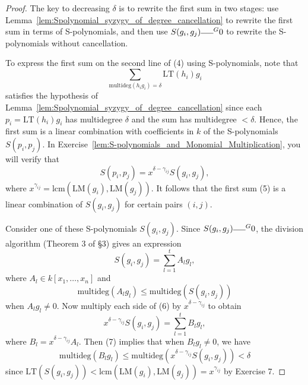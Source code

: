 \begin{proof}
  The key to decreasing $\delta$ is to rewrite the first sum in two stages: use Lemma~\ref{lem:Spolynomial_syzygy_of_degree_cancellation} to rewrite the first sum in terms of S-polynomials, and then use $S(g_i, g_j) \overline{\hspace{1.5em}}^G 0$ to rewrite the S-polynomials without cancellation.

  To express the first sum on the second line of (4) using S-polynomials, note that
  \begin{equation} \tag{5}
  \sum_{\text{multideg}(h_i g_i) = \delta} \text{LT}(h_i) g_i
  \end{equation}
  satisfies the hypothesis of Lemma~\ref{lem:Spolynomial_syzygy_of_degree_cancellation} since each $p_i = \text{LT}(h_i) g_i$ has multidegree $\delta$ and the sum has multidegree $<\delta$. Hence, the first sum is a linear combination with coefficients in $k$ of the S-polynomials $S(p_i, p_j)$. In Exercise~\ref{lem:S-polynomials_and_Monomial_Multiplication}, you will verify that
  \[
  S(p_i, p_j) = x^{\delta - \gamma_{ij}} S(g_i, g_j),
  \]
  where $x^{\gamma_{ij}} = \text{lcm}(\text{LM}(g_i), \text{LM}(g_j))$. It follows that the first sum (5) is a linear combination of $S(g_i, g_j)$ for certain pairs $(i, j)$.

  Consider one of these S-polynomials $S(g_i, g_j)$. Since $S(g_i, g_j) \overline{\hspace{1.5em}}^G 0$, the division algorithm (Theorem 3 of §3) gives an expression
  \begin{equation} \tag{6}
  S(g_i, g_j) = \sum_{l=1}^t A_l g_l,
  \end{equation}
  where $A_l \in k[x_1, \dots, x_n]$ and
  \begin{equation} \tag{7}
  \text{multideg}(A_l g_l) \le \text{multideg}(S(g_i, g_j))
  \end{equation}
  when $A_l g_l \ne 0$. Now multiply each side of (6) by $x^{\delta - \gamma_{ij}}$ to obtain
  \begin{equation} \tag{8}
  x^{\delta - \gamma_{ij}} S(g_i, g_j) = \sum_{l=1}^t B_l g_l,
  \end{equation}
  where $B_l = x^{\delta - \gamma_{ij}} A_l$. Then (7) implies that when $B_l g_l \ne 0$, we have
  \begin{equation} \tag{9}
  \text{multideg}(B_l g_l) \le \text{multideg}(x^{\delta - \gamma_{ij}} S(g_i, g_j)) < \delta
  \end{equation}
  since $\text{LT}(S(g_i, g_j)) < \text{lcm}(\text{LM}(g_i), \text{LM}(g_j)) = x^{\gamma_{ij}}$ by Exercise 7.


\end{proof}
